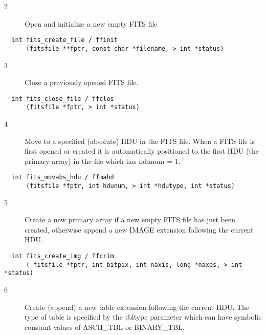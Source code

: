 \begin{description}
\item[2 ] Open and initialize a new empty FITS file
\end{description}

\begin{verbatim}
  int fits_create_file / ffinit
      (fitsfile **fptr, const char *filename, > int *status)
\end{verbatim}

\begin{description}
\item[3 ]Close a previously opened FITS file.
\end{description}

\begin{verbatim}
  int fits_close_file / ffclos
      (fitsfile *fptr, > int *status)
\end{verbatim}

\begin{description}
\item[4 ] Move to a specified (absolute) HDU in the FITS file.  When a FITS file
    is first opened or created it is automatically positioned to the first
   HDU (the primary array) in the file which has hdunum = 1.
\end{description}

\begin{verbatim}
  int fits_movabs_hdu / ffmahd
      (fitsfile *fptr, int hdunum, > int *hdutype, int *status)
\end{verbatim}

\begin{description}
\item[5 ]Create a new primary array if a new empty FITS file has just been
  created, otherwise append a new IMAGE extension following the current HDU.
\end{description}

\begin{verbatim}
  int fits_create_img / ffcrim
      ( fitsfile *fptr, int bitpix, int naxis, long *naxes, > int *status)
\end{verbatim}

\begin{description}
\item[6 ]Create (append) a new table extension following the current HDU.
   The type of table is specified by the tbltype parameter which can have
  symbolic constant values of ASCII\_TBL or BINARY\_TBL.
\end{description}

